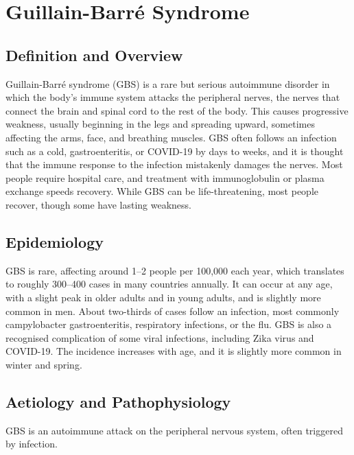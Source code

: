 \chapter{Guillain-Barré Syndrome}

\section*{Definition and Overview}
Guillain-Barré syndrome (GBS) is a rare but serious autoimmune disorder in which the body's immune system attacks the peripheral nerves, the nerves that connect the brain and spinal cord to the rest of the body. This causes progressive weakness, usually beginning in the legs and spreading upward, sometimes affecting the arms, face, and breathing muscles. GBS often follows an infection such as a cold, gastroenteritis, or COVID-19 by days to weeks, and it is thought that the immune response to the infection mistakenly damages the nerves. Most people require hospital care, and treatment with immunoglobulin or plasma exchange speeds recovery. While GBS can be life-threatening, most people recover, though some have lasting weakness.

\section*{Epidemiology}
GBS is rare, affecting around 1--2 people per 100,000 each year, which translates to roughly 300--400 cases in many countries annually. It can occur at any age, with a slight peak in older adults and in young adults, and is slightly more common in men. About two-thirds of cases follow an infection, most commonly campylobacter gastroenteritis, respiratory infections, or the flu. GBS is also a recognised complication of some viral infections, including Zika virus and COVID-19. The incidence increases with age, and it is slightly more common in winter and spring.

\section*{Aetiology and Pathophysiology}
GBS is an autoimmune attack on the peripheral nervous system, often triggered by infection.


